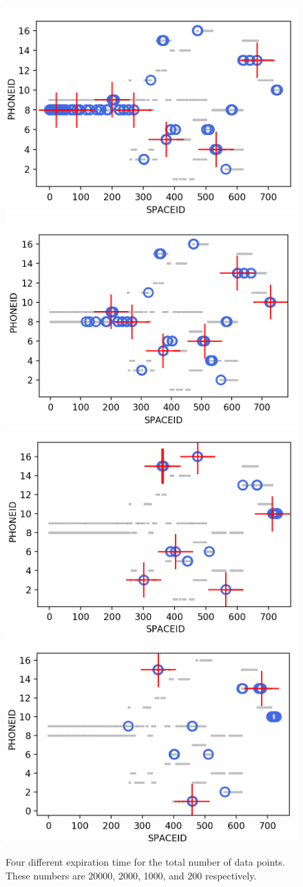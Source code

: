 \begin{figure}[!ht]
    \centering
        \includegraphics[width = 7.5 cm]{image/Chapters/Chapter6/DSAPalldays.png}\hfill
        \includegraphics[width = 7.5 cm]{image/Chapters/Chapter6/DSAPalldays2000fad.png}\hfill
        \includegraphics[width = 7.5 cm]{image/Chapters/Chapter6/DSAPalldays1000fad.png}\hfill
        \includegraphics[width = 7.5 cm]{image/Chapters/Chapter6/DSAPalldays200fad.png}\hfill
    \caption{Four different expiration time for the total number of data points. These numbers are 20000, 2000, 1000, and 200 respectively.}
    \label{expirationchang}
\end{figure}

